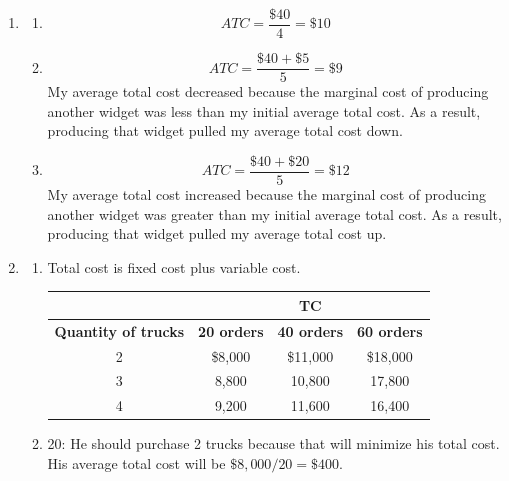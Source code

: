 \documentclass{article}
\begin{document}
\begin{enumerate}
	
\item

	\begin{enumerate}
	
	\item \begin{equation*}
		ATC = \frac{\$40}{4} = \$10
		\end{equation*}
		
	\item \begin{equation*}
		ATC = \frac{\$40 + \$5}{5} = \$9
		\end{equation*}
		My average total cost decreased because the marginal cost of producing another widget was less than my initial average total cost. As a result, producing that widget pulled my average total cost down.
		
	\item \begin{equation*}
		ATC = \frac{\$40  + \$20}{5} = \$12
		\end{equation*}
		My average total cost increased because the marginal cost of producing another widget was greater than my initial average total cost. As a result, producing that widget pulled my average total cost up.
	
	\end{enumerate}
	
\item

	\begin{enumerate}
	
	\item Total cost is fixed cost plus variable cost.
		\begin{center}
		\begin{tabular}{ c | c | c | c }
		& \multicolumn{3}{c}{\textbf{TC} } \\
		\hline
		\textbf{Quantity of trucks} & \textbf{20 orders} & \textbf{40 orders} & \textbf{60 orders} \\
		\hline
		2 & \$8,000 & \$11,000 & \$18,000 \\
		\hline
		3 & 8,800 & 10,800 & 17,800 \\
		\hline
		4 & 9,200 & 11,600 & 16,400
		\end{tabular}
		\end{center}
		
	\item 20: He should purchase 2 trucks because that will minimize his total cost. His average total cost will be $\$8,000 / 20 = \$400$.


\end{enumerate}
\end{enumerate}
\end{document}
